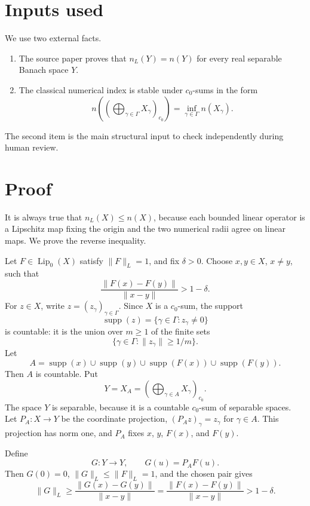 \documentclass[11pt]{article}
\DeclareMathOperator{\Lip}{Lip}
\begin{document}
\section*{Inputs used}

We use two external facts.

\begin{enumerate}
\item The source paper proves that \(n_L(Y)=n(Y)\) for every real separable Banach space \(Y\).
\item The classical numerical index is stable under \(c_0\)-sums in the form
\[
    n\left(\left(\bigoplus_{\gamma\in\Gamma}X_\gamma\right)_{c_0}\right)
    =
    \inf_{\gamma\in\Gamma} n(X_\gamma).
\]
\end{enumerate}

The second item is the main structural input to check independently during human review.

\section*{Proof}

It is always true that \(n_L(X)\leq n(X)\), because each bounded linear operator is a Lipschitz map fixing the origin and the two numerical radii agree on linear maps. We prove the reverse inequality.

Let \(F\in \Lip_0(X)\) satisfy \(\|F\|_L=1\), and fix \(\delta>0\). Choose \(x,y\in X\), \(x\neq y\), such that
\[
    \frac{\|F(x)-F(y)\|}{\|x-y\|}>1-\delta.
\]
For \(z\in X\), write \(z=(z_\gamma)_{\gamma\in\Gamma}\). Since \(X\) is a \(c_0\)-sum, the support
\[
    \operatorname{supp}(z)=\{\gamma\in\Gamma:z_\gamma\neq 0\}
\]
is countable: it is the union over \(m\geq1\) of the finite sets
\[
    \{\gamma\in\Gamma:\|z_\gamma\|\geq 1/m\}.
\]
Let
\[
    A=\operatorname{supp}(x)\cup\operatorname{supp}(y)\cup
      \operatorname{supp}(F(x))\cup\operatorname{supp}(F(y)).
\]
Then \(A\) is countable. Put
\[
    Y=X_A=\left(\bigoplus_{\gamma\in A}X_\gamma\right)_{c_0}.
\]
The space \(Y\) is separable, because it is a countable \(c_0\)-sum of separable spaces. Let \(P_A:X\to Y\) be the coordinate projection, \((P_A z)_\gamma=z_\gamma\) for \(\gamma\in A\). This projection has norm one, and \(P_A\) fixes \(x\), \(y\), \(F(x)\), and \(F(y)\).

Define
\[
    G:Y\longrightarrow Y,\qquad G(u)=P_A F(u).
\]
Then \(G(0)=0\), \(\|G\|_L\leq \|F\|_L=1\), and the chosen pair gives
\[
    \|G\|_L
    \geq
    \frac{\|G(x)-G(y)\|}{\|x-y\|}
    =
    \frac{\|F(x)-F(y)\|}{\|x-y\|}
    >1-\delta.
\]
\end{document}

